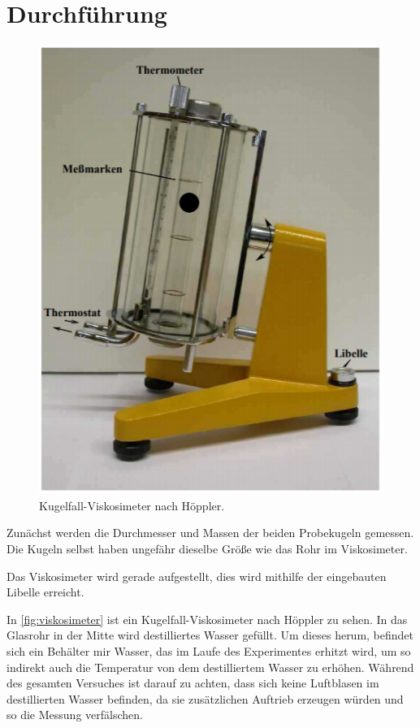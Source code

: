 \section{Durchführung}
\label{sec:Durchführung}

\begin{figure}
  \centering
  \includegraphics{content/viskosimeter.PNG}
  \caption{Kugelfall-Viskosimeter nach Höppler. \cite[2]{V207}}
  \label{fig:viskosimeter}
\end{figure}

Zunächst werden die Durchmesser und Massen der beiden Probekugeln gemessen. Die Kugeln selbst haben ungefähr dieselbe Größe wie das Rohr im Viskosimeter.

Das Viskosimeter wird gerade aufgestellt, dies wird mithilfe der eingebauten Libelle erreicht.

In \autoref{fig:viskosimeter} ist ein Kugelfall-Viskosimeter nach Höppler zu sehen. In das Glasrohr in der Mitte wird destilliertes Wasser gefüllt. Um dieses herum, befindet sich ein Behälter mir Wasser, das im Laufe des Experimentes erhitzt wird, um so indirekt auch die Temperatur von dem destilliertem Wasser zu erhöhen.
Während des gesamten Versuches ist darauf zu achten, dass sich keine Luftblasen im destillierten Wasser befinden, da sie zusätzlichen Auftrieb erzeugen würden und so die Messung verfälschen.

